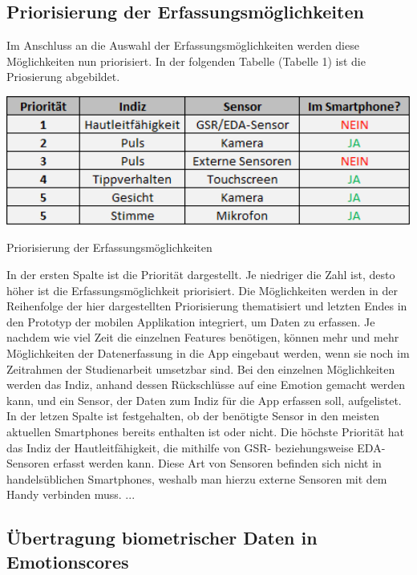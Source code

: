 \subsection{Priorisierung der Erfassungsmöglichkeiten}
Im Anschluss an die Auswahl der Erfassungsmöglichkeiten werden diese Möglichkeiten nun priorisiert. In der folgenden Tabelle (Tabelle 1) ist die Priosierung abgebildet. \newline
\begin{table}[h]
	\centering
	\includegraphics[width=14cm]{Bilder/prio.png}
	\caption[Priorisierung der Erfassungsmöglichkeiten]{Priorisierung der Erfassungsmöglichkeiten}
\end{table}%
\newline In der ersten Spalte ist die Priorität dargestellt. Je niedriger die Zahl ist, desto höher ist die Erfassungsmöglichkeit priorisiert. Die Möglichkeiten werden in der Reihenfolge der hier dargestellten Priorisierung thematisiert und letzten Endes in den Prototyp der mobilen Applikation integriert, um Daten zu erfassen. Je nachdem wie viel Zeit die einzelnen Features benötigen, können mehr und mehr Möglichkeiten der Datenerfassung in die App eingebaut werden, wenn sie noch im Zeitrahmen der Studienarbeit umsetzbar sind. Bei den einzelnen Möglichkeiten werden das Indiz, anhand dessen Rückschlüsse auf eine Emotion gemacht werden kann, und ein Sensor, der Daten zum Indiz für die App erfassen soll, aufgelistet. In der letzen Spalte ist festgehalten, ob der benötigte Sensor in den meisten aktuellen Smartphones bereits enthalten ist oder nicht. \newline
Die höchste Priorität hat das Indiz der Hautleitfähigkeit, die mithilfe von GSR- beziehungsweise EDA-Sensoren erfasst werden kann. Diese Art von Sensoren befinden sich nicht in handelsüblichen Smartphones, weshalb man hierzu externe Sensoren mit dem Handy verbinden muss. \newline
...

\subsection{Übertragung biometrischer Daten in Emotionscores}
